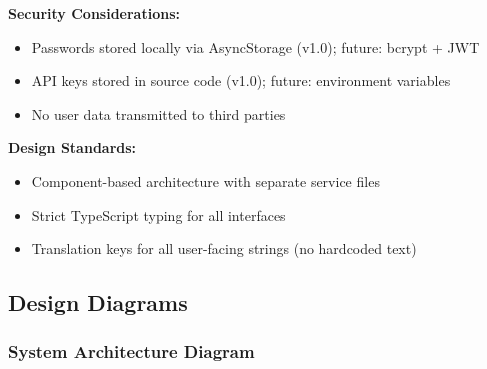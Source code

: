 \documentclass[12pt,a4paper]{article}
\begin{document}
\textbf{Security Considerations:}
\begin{itemize}
    \item Passwords stored locally via AsyncStorage (v1.0); future: bcrypt + JWT
    \item API keys stored in source code (v1.0); future: environment variables
    \item No user data transmitted to third parties
\end{itemize}

\textbf{Design Standards:}
\begin{itemize}
    \item Component-based architecture with separate service files
    \item Strict TypeScript typing for all interfaces
    \item Translation keys for all user-facing strings (no hardcoded text)
\end{itemize}

\subsection{Design Diagrams}

\subsubsection{System Architecture Diagram}
\end{document}
